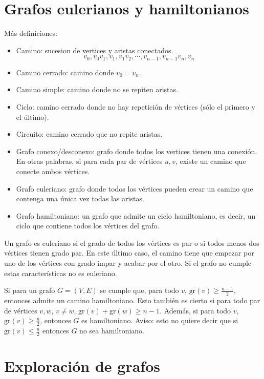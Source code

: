 \documentclass[a4paper]{article}
\begin{document}
\section*{Grafos eulerianos y hamiltonianos}
Más definiciones:
\begin{itemize}
	\item Camino: sucesion de vertices y aristas conectados.
	$$v_0,v_0v_1,v_1,v_1v_2,\cdots,v_{n-1},v_{n-1}v_n,v_n$$
	\item Camino cerrado: camino donde $v_0=v_n$.
	\item Camino simple: camino donde no se repiten aristas.
	\item Ciclo: camino cerrado donde no hay repetición de vértices (sólo el primero y el último).
	\item Circuito: camino cerrado que no repite aristas.
	\item Grafo conexo/desconexo: grafo donde todos los vertices tienen una conexión. En otras palabras, si para cada par de vértices $u,v$, existe un camino que conecte ambos vértices.
	\item Grafo euleriano: grafo donde todos los vértices pueden crear un camino que contenga una única vez todas las aristas.
	\item Grafo hamiltoniano: un grafo que admite un ciclo hamiltoniano, es decir, un ciclo que contiene todos los vértices del grafo. 
\end{itemize}

\hrulefill

Un grafo es euleriano si el grado de todos los vértices es par o si todos menos dos vértices tienen grado par. En este último caso, el camino tiene que empezar por uno de los vértices con grado impar y acabar por el otro. Si el grafo no cumple estas características no es euleriano.

\hrulefill

Si para un grafo $G=(V,E)$ se cumple que, para todo $v$, $\text{gr}(v) \ge \frac{n-1}{2}$, entonces admite un camino hamiltoniano. Esto también es cierto si para todo par de vértices $v,w$, $v\neq w$, $\text{gr}(v)+\text{gr}(w) \ge n-1$. Además, si para todo $v$, $\text{gr}(v) \ge \frac{n}{2}$, entonces $G$ es hamiltoniano. Aviso: esto no quiere decir que si $\text{gr}(v) \le \frac{n}{2}$ entonces $G$ no sea hamiltoniano.

\section*{Exploración de grafos}
\end{document}
